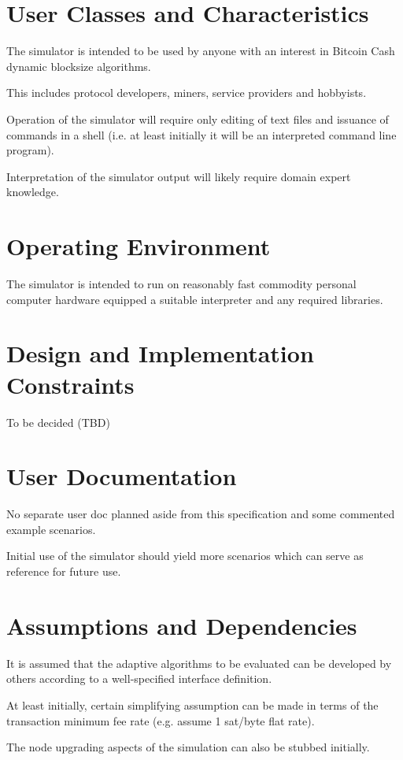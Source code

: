 \documentclass{scrreprt}
\begin{document}
\section{User Classes and Characteristics}
The simulator is intended to be used by anyone with an interest in Bitcoin Cash
dynamic blocksize algorithms.

This includes protocol developers, miners, service providers and hobbyists.

Operation of the simulator will require only editing of text files and issuance of
commands in a shell (i.e. at least initially it will be an interpreted command line
program).

Interpretation of the simulator output will likely require domain expert knowledge.


\section{Operating Environment}
The simulator is intended to run on reasonably fast commodity personal
computer hardware equipped a suitable interpreter and any required libraries.


\section{Design and Implementation Constraints}
To be decided (TBD)


\section{User Documentation}
No separate user doc planned aside from this specification and some commented
example scenarios.

Initial use of the simulator should yield more scenarios which can serve as
reference for future use.


\section{Assumptions and Dependencies}
It is assumed that the adaptive algorithms to be evaluated can be developed
by others according to a well-specified interface definition.

At least initially, certain simplifying assumption can be made in terms
of the transaction minimum fee rate (e.g. assume 1 sat/byte flat rate).

The node upgrading aspects of the simulation can also be stubbed initially.
\end{document}
